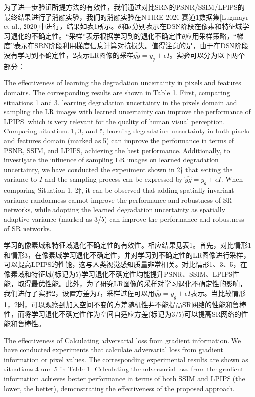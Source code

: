 为了进一步验证所提方法的有效性，我们通过对比SRN的PSNR/SSIM/LPIPS的最终结果进行了消融实验，我们的消融实验在NTIRE 2020 赛道1数据集[Lugmayr et al., 2020]中进行，结果如表1所示。$\theta$和$\sigma$分别表示在DSN阶段在像素和特征域学习退化的不确定性。“采样”表示根据学习到的退化不确定性$\theta$应用采样策略，“梯度”表示在SRN阶段利用梯度信息计算对抗损失。值得注意的是，由于在DSN阶段没有学习到不确定性，2表示LR图像的采样$\hat{yg} = y_g + \epsilon I$。实验可以分为以下两个部分：

The effectiveness of learning the degradation uncertainty in pixels and features domains. The corresponding results are shown in Table 1. First, comparing situations 1 and 3, learning degradation uncertainty in the pixels domain and sampling the LR images with learned uncertainty can improve the performance of LPIPS, which is very relevant for the quality of human visual perception. Comparing situations 1, 3, and 5, learning degradation uncertainty in both pixels and features domain (marked as 5) can improve the performance in terms of PSNR, SSIM, and LPIPS, achieving the best performance. Additionally, to investigate the influence of sampling LR images on learned degradation uncertainty, we have conducted the experiment shown in 2† that setting the variance to $I$ and the sampling process can be expressed by $\hat{yg} = y_g + \epsilon I$. When comparing Situation 1, 2†, it can be observed that adding spatially invariant variance randomness cannot improve the performance and robustness of SR networks, while adopting the learned degradation uncertainty as spatially adaptive variance (marked as 3/5) can improve the performance and robustness of SR networks.

学习的像素域和特征域退化不确定性的有效性。相应结果见表1。首先，对比情形1和情形3，在像素域学习退化不确定性，并对学习到不确定性的LR图像进行采样，可以提高LPIPS的性能，这与人类视觉感知质量非常相关。对比情形1、3、5，在像素域和特征域(标记为5)学习退化不确定性均能提升PSNR、SSIM、LPIPS性能，取得最优性能。此外，为了研究LR图像的采样对学习退化不确定性的影响，我们进行了实验2，设置方差为$I$，采样过程可以用$\hat{yg} = y_g + \epsilon I$表示。当比较情形1，2时，可以观察到加入空间不变的方差随机性并不能提高SR网络的性能和鲁棒性，而将学习退化不确定性作为空间自适应方差(标记为3/5)可以提高SR网络的性能和鲁棒性。

The effectiveness of Calculating adversarial loss from gradient information. We have conducted experiments that calculate adversarial loss from gradient information or pixel values. The corresponding experimental results are shown as situations 4 and 5 in Table 1. Calculating the adversarial loss from the gradient information achieves better performance in terms of both SSIM and LPIPS (the lower, the better), demonstrating the effectiveness of the proposed approach.

